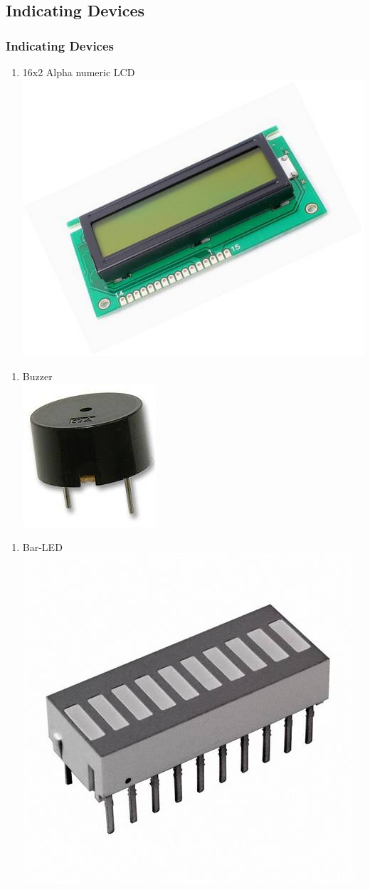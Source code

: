 \documentclass[10pt,red]{beamer}
\begin{document}

\subsection{Indicating Devices}
\begin{frame}
	\frametitle{Indicating Devices} \pause
		\begin{minipage}[c]{0.5\textwidth}
			\begin{enumerate}[$\checkmark$]
				\item<1->	16x2 Alpha numeric LCD \pause \\[2pt]
				\includegraphics[width=0.4\linewidth]{lcd} \\
			\end{enumerate}
		\end{minipage}
		
		\pause
		\vfill
				\begin{minipage}[c]{0.5\textwidth}
			\begin{enumerate}[$\checkmark$]
				\item<2->	Buzzer \pause \\[2pt]
				\includegraphics[width=0.2\linewidth]{buzzer}\\
			\end{enumerate}
		\end{minipage}
		
		\pause
		\vfill
		\begin{minipage}[c]{0.5\textwidth}
			\begin{enumerate}[$\checkmark$]
				\item<3->	Bar-LED \pause \\[2pt]
				\includegraphics[width=0.3\linewidth]{barled}\\
			\end{enumerate}
		\end{minipage}
		
		
\end{frame}
\end{document}
